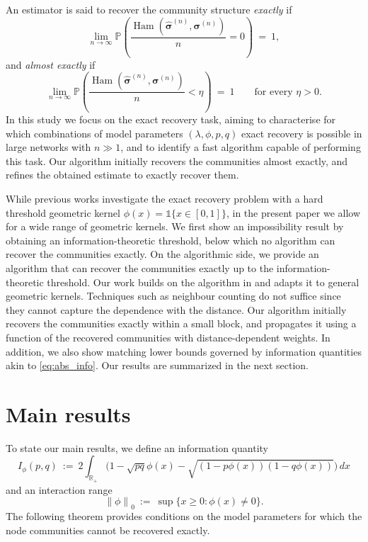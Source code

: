 \documentclass[letterpaper,11pt]{article}
\theoremstyle{definition}
\def\P{\mathbb{P}}
\def\R{\mathbb{R}}
\newcommand{\bsigma}{\bm{\sigma}}
\newcommand{\hbsigma}{\hat{\bsigma}}
\def\weq{ \ = \ }
\newcommand{\zeronorm}[1]{{\lVert#1\rVert}_0}
\numberwithin{equation}{section}
\newcommand{\la}{\lambda}
\newcommand{\Ham}{\operatorname{Ham}}
\theoremstyle{definition}
\def\P{\mathbb{P}}
\def\R{\mathbb{R}}
\newcommand{\bsigma}{\bm{\sigma}}
\newcommand{\hbsigma}{\hat{\bsigma}}
\def\weq{ \ = \ }
\newcommand{\zeronorm}[1]{{\lVert#1\rVert}_0}
\numberwithin{equation}{section}
\newcommand{\la}{\lambda}
\newcommand{\Ham}{\operatorname{Ham}}
\theoremstyle{thmstyletwo}%
\begin{document}
An estimator is said to recover the community structure \emph{exactly} if 
\begin{equation}
\lim_{n \to \infty} \P \left( \frac{\Ham(\hbsigma^{(n)},\bsigma^{(n)})}{n} = 0 \right) \weq 1,
\label{eq:exact_recovery}
\end{equation}
and \emph{almost exactly} if
\begin{equation}
\lim_{n \to \infty} \P\left( \frac{\Ham(\hbsigma^{(n)},\bsigma^{(n)})}{n} < \eta \right)
\weq 1
\qquad \text{for every $\eta >0$}.
\label{eq:almost_exact_recovery}
\end{equation}
In this study we focus on the exact recovery task, aiming to characterise for which combinations of model parameters $(\la, \phi, p, q)$ exact recovery is possible in large networks with $n \gg 1$, and to identify a fast algorithm capable of performing this task. Our algorithm initially recovers the communities almost exactly, and refines the obtained estimate to exactly recover them. 

While previous works \cite{abbe2021community,gaudio2024exact,gaudio2024exactERG} investigate the exact recovery problem with a hard threshold geometric kernel $\phi(x) = \mathds{1}\{x\in [0,1]\}$, in the present paper we allow for a wide range of geometric kernels. We first show an impossibility result by obtaining an information-theoretic threshold,
below which no algorithm can recover the communities exactly.
On the algorithmic side, we provide an algorithm that can recover the communities exactly up to the information-theoretic threshold.
Our work builds on the algorithm in \cite{gaudio2024exact} and adapts it to general geometric kernels. Techniques such as neighbour counting do not suffice since they cannot capture the dependence with the distance.
Our algorithm initially recovers the communities exactly within a small block,
and propagates it using a function of the recovered communities with
distance-dependent
weights.
In addition, we also show matching lower bounds governed by information quantities akin to \eqref{eq:abs_info}. Our results are summarized in the next section.


\section{Main results}
\label{sec:main_results}

To state our main results, we define an information quantity 
\begin{equation}
I_{\phi}(p,q)
\ := \ 2 \int_{\R_+} \bigg( 1- \sqrt{pq} \phi(x) - \sqrt{(1-p\phi(x))(1-q\phi(x))} \bigg) \, dx
\label{eq:info_metric}
\end{equation}
and an interaction range
\begin{equation}
\zeronorm{\phi}
\ := \
\sup \{x \ge 0 \colon \phi(x) \ne 0\}.
\label{eq:kappa}
\end{equation}
The following theorem provides conditions on the model parameters for which the node communities cannot be recovered exactly.
\end{document}
